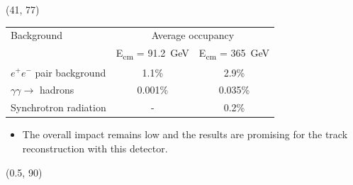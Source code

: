 \documentclass[final,xcolor={dvipsnames,svgnames,x11names,table}]{beamer}
\begin{document}
\begin{frame}
\begin{textblock}{40}
\begin{tcolorbox}[title=Main sources of beam-induced backgrounds]
  \end{tcolorbox}
\end{textblock}

\begin{textblock}{40}(41, 77)
  \begin{tcolorbox}[title=Summary of beam-induced backgrounds \& conclusions]

  \centering
	\begin{tabular}{l c c}
  	\toprule
	   Background & \multicolumn{2}{c}{Average occupancy} \\
	    & E\textsubscript{cm} = 91.2~GeV &  E\textsubscript{cm} = 365~GeV \\
	   \midrule
	   $e^+e^-$ pair background & 1.1\% & 2.9\% \\
	   $\gamma\gamma\rightarrow$ hadrons & 0.001\% & 0.035\%  \\
	   Synchrotron radiation & - & 0.2\% \\
	   \bottomrule
	\end{tabular}

  \begin{itemize}
    \item The overall impact remains low and the results are promising for the track reconstruction with this detector.
  \end{itemize}

  \end{tcolorbox}
\end{textblock}

\begin{textblock}{80}(0.5, 90)
  \begin{tcolorbox}[title=3 main sources of beam-induced backgrounds at the top stage]


\end{tcolorbox}
\end{textblock}
\end{frame}
\end{document}
